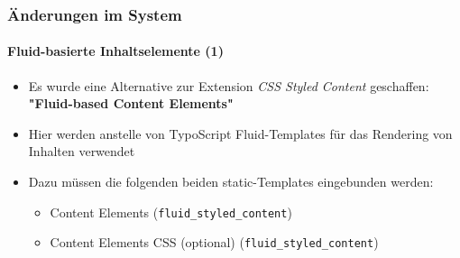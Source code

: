 %

\begin{frame}[fragile]
	\frametitle{Änderungen im System}
	\framesubtitle{Fluid-basierte Inhaltselemente (1)}

	\begin{itemize}

		\item Es wurde eine Alternative zur Extension \textit{CSS Styled Content} geschaffen:\newline
			\textbf{"Fluid-based Content Elements"}

		\item Hier werden anstelle von TypoScript Fluid-Templates für das Rendering von Inhalten verwendet

		\item Dazu müssen die folgenden beiden static-Templates eingebunden werden:

			\begin{itemize}
				\item Content Elements (\texttt{fluid\_styled\_content})
				\item Content Elements CSS (optional) (\texttt{fluid\_styled\_content})
			\end{itemize}

	\end{itemize}

\end{frame}


